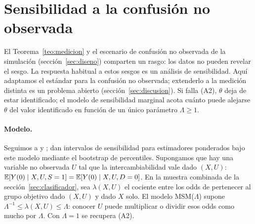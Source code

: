 \section{Sensibilidad a la confusión no observada}\label{sec:sensibilidad}

El Teorema~\ref{teo:medicion} y el escenario de confusión no observada de la simulación (sección~\ref{sec:diseno}) comparten un rasgo: los datos no pueden revelar el sesgo. La respuesta habitual a estos sesgos es un análisis de sensibilidad. Aquí adaptamos el estándar para la confusión no observada; extenderlo a la medición distinta es un problema abierto (sección~\ref{sec:discusion}). Si falla (A2), $\theta$ deja de estar identificado; el modelo de sensibilidad marginal acota cuánto puede alejarse $\theta$ del valor identificado en función de un único parámetro $\Lambda\ge1$.

\paragraph{Modelo.} Seguimos a \citet{tan2006} y \citet{dorn2023}; \citet{zhao2019} dan intervalos de sensibilidad para estimadores ponderados bajo este modelo mediante el bootstrap de percentiles. Supongamos que hay una variable no observada $U$ tal que la intercambiabilidad vale dado $(X,U)$: $\mathbb{E}[Y(0)\mid X,U,S=1]=\mathbb{E}[Y(0)\mid X,U,D=0]$. En la muestra combinada de la sección~\ref{sec:clasificador}, sea $\lambda(X,U)$ el cociente entre los odds de pertenecer al grupo objetivo dado $(X,U)$ y dado $X$ solo. El modelo MSM($\Lambda$) supone $\Lambda^{-1}\le\lambda(X,U)\le\Lambda$: conocer $U$ puede multiplicar o dividir esos odds como mucho por $\Lambda$. Con $\Lambda=1$ se recupera (A2).

